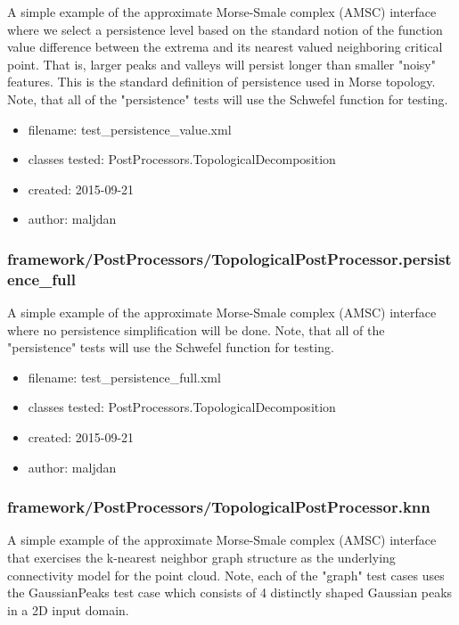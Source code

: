        A simple example of the approximate Morse-Smale complex (AMSC) interface
       where we select a persistence level based on the standard notion of the
       function value difference between the extrema and its nearest valued
       neighboring critical point. That is, larger peaks and valleys will
       persist longer than smaller "noisy" features. This is the standard
       definition of persistence used in Morse topology. Note, that all of the
       "persistence" tests will use the Schwefel function for testing.
    
      \begin{itemize}
          \item filename: test\_persistence\_value.xml
          \item classes tested: PostProcessors.TopologicalDecomposition
          \item created: 2015-09-21
          \item author: maljdan
      \end{itemize}
    \subsubsection{framework/PostProcessors/TopologicalPostProcessor.persistence\_full}
      
       A simple example of the approximate Morse-Smale complex (AMSC) interface
       where no persistence simplification will be done. Note, that all of the
       "persistence" tests will use the Schwefel function for testing.
    
      \begin{itemize}
          \item filename: test\_persistence\_full.xml
          \item classes tested: PostProcessors.TopologicalDecomposition
          \item created: 2015-09-21
          \item author: maljdan
      \end{itemize}
    \subsubsection{framework/PostProcessors/TopologicalPostProcessor.knn}
      
       A simple example of the approximate Morse-Smale complex (AMSC) interface
       that exercises the k-nearest neighbor graph structure as the underlying
       connectivity model for the point cloud. Note, each of the "graph" test
       cases uses the GaussianPeaks test case which consists of 4 distinctly
       shaped Gaussian peaks in a 2D input domain.
    
